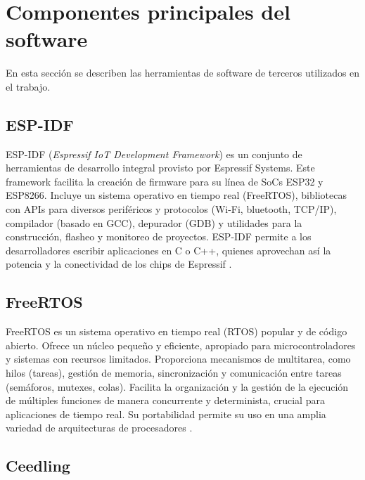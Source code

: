 



\section{Componentes principales del software}
\label{sec:sw:components}
En esta sección se describen las herramientas de software de terceros utilizados en el trabajo.


\subsection{ESP-IDF}

ESP-IDF (\textit{Espressif IoT Development Framework}) es un conjunto de herramientas de desarrollo integral provisto por Espressif Systems. Este framework facilita la creación de firmware para su línea de SoCs ESP32 y ESP8266. Incluye un sistema operativo en tiempo real (FreeRTOS), bibliotecas con APIs para diversos periféricos y protocolos (Wi-Fi, bluetooth, TCP/IP), compilador (basado en GCC), depurador (GDB) y utilidades para la construcción, flasheo y monitoreo de proyectos. ESP-IDF permite a los desarrolladores escribir aplicaciones en C o C++, quienes aprovechan así la potencia y la conectividad de los chips de Espressif \cite{ESPIDF}.


\subsection{FreeRTOS}

FreeRTOS es un sistema operativo en tiempo real (RTOS) popular y de código abierto. Ofrece un núcleo pequeño y eficiente, apropiado para microcontroladores y sistemas con recursos limitados. Proporciona mecanismos de multitarea, como hilos (tareas), gestión de memoria, sincronización y comunicación entre tareas (semáforos, mutexes, colas). Facilita la organización y la gestión de la ejecución de múltiples funciones de manera concurrente y determinista, crucial para aplicaciones de tiempo real. Su portabilidad permite su uso en una amplia variedad de arquitecturas de procesadores \cite{FREERTOS}.

\subsection{Ceedling}

